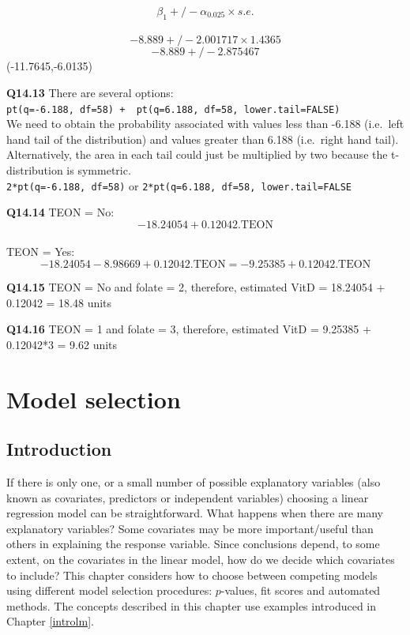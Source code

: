 \documentclass[
  oneside]{krantz}
\begin{document}
\[\beta_1 +/- \alpha_0.025 \times s.e.\]\\
\[ -8.889 +/-  2.001717 \times 1.4365\]
\[ -8.889 +/- 2.875467\]
(-11.7645,-6.0135)

\textbf{Q14.13} There are several options:\\
\texttt{pt(q=-6.188,\ df=58)\ +\ \ pt(q=6.188,\ df=58,\ lower.tail=FALSE)}~\\
We need to obtain the probability associated with values less than -6.188 (i.e.~left hand tail of the distribution) and values greater than 6.188 (i.e.~right hand tail). Alternatively, the area in each tail could just be multiplied by two because the t-distribution is symmetric.\\
\texttt{2*pt(q=-6.188,\ df=58)} or \texttt{2*pt(q=6.188,\ df=58,\ lower.tail=FALSE}

\textbf{Q14.14} TEON = No: \[-18.24054 + 0.12042.\textrm{TEON}\]\\
TEON = Yes: \[-18.24054 -8.98669 + 0.12042.\textrm{TEON}  = 
- 9.25385 + 0.12042.\textrm{TEON} \]

\textbf{Q14.15} TEON = No and folate = 2, therefore, estimated VitD = 18.24054 + 0.12042 = 18.48 units

\textbf{Q14.16} TEON = 1 and folate = 3, therefore, estimated VitD = 9.25385 + 0.12042*3 = 9.62 units

\hypertarget{modelselection}{%
\chapter{Model selection}\label{modelselection}}

\hypertarget{INTmodsel}{%
\section{Introduction}\label{INTmodsel}}

If there is only one, or a small number of possible explanatory variables (also known as covariates, predictors or independent variables) choosing a linear regression model can be straightforward. What happens when there are many explanatory variables? Some covariates may be more important/useful than others in explaining the response variable. Since conclusions depend, to some extent, on the covariates in the linear model, how do we decide which covariates to include? This chapter considers how to choose between competing models using different model selection procedures: \(p\)-values, fit scores and automated methods. The concepts described in this chapter use examples introduced in Chapter \ref{introlm}.
\end{document}
